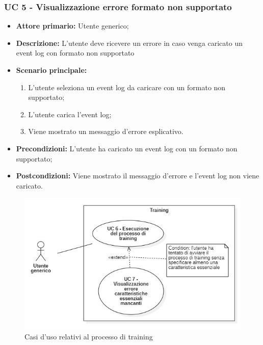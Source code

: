 \subsubsection{UC 5 - Visualizzazione errore formato non supportato}
\begin{itemize}
	\item \textbf{Attore primario:} Utente generico;
	\item \textbf{Descrizione:} L'utente deve ricevere un errore in caso venga caricato un event log con formato non supportato
	\item \textbf{Scenario principale:} 
		\begin{enumerate}
			\item L'utente seleziona un event log da caricare con un formato non supportato;
			\item L'utente carica l'event log;
			\item Viene mostrato un messaggio d'errore esplicativo.
		\end{enumerate}
	
	\item \textbf{Precondizioni:} L'utente ha caricato un event log con un formato non supportato;
	\item \textbf{Postcondizioni:} Viene mostrato il messaggio d'errore e l'event log non viene caricato.
\end{itemize}



\begin{figure}[H]
    \centering
    \includegraphics[scale=0.6]{immagini/usecase/cd2.JPG}
    \caption{Casi d'uso relativi al processo di training}
\end{figure}

